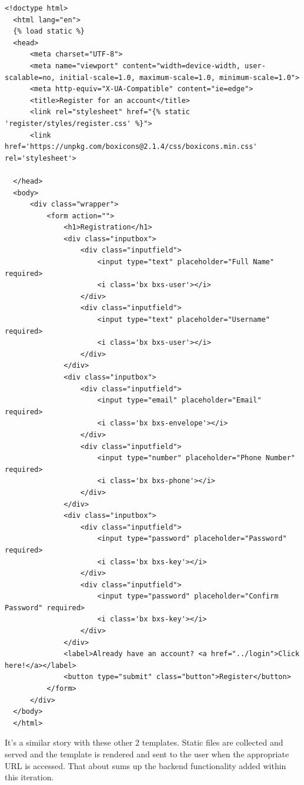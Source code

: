 \documentclass{article}
\begin{document}
\begin{lstlisting}[caption={templates/register.html}]
  <!doctype html>
  <html lang="en">
  {% load static %}
  <head>
      <meta charset="UTF-8">
      <meta name="viewport" content="width=device-width, user-scalable=no, initial-scale=1.0, maximum-scale=1.0, minimum-scale=1.0">
      <meta http-equiv="X-UA-Compatible" content="ie=edge">
      <title>Register for an account</title>
      <link rel="stylesheet" href="{% static 'register/styles/register.css' %}">
      <link href='https://unpkg.com/boxicons@2.1.4/css/boxicons.min.css' rel='stylesheet'>
  
  </head>
  <body>
      <div class="wrapper">
          <form action="">
              <h1>Registration</h1>
              <div class="inputbox">
                  <div class="inputfield">
                      <input type="text" placeholder="Full Name" required>
                      <i class='bx bxs-user'></i>
                  </div>
                  <div class="inputfield">
                      <input type="text" placeholder="Username" required>
                      <i class='bx bxs-user'></i>
                  </div>
              </div>
              <div class="inputbox">
                  <div class="inputfield">
                      <input type="email" placeholder="Email" required>
                      <i class='bx bxs-envelope'></i>
                  </div>
                  <div class="inputfield">
                      <input type="number" placeholder="Phone Number" required>
                      <i class='bx bxs-phone'></i>
                  </div>
              </div>
              <div class="inputbox">
                  <div class="inputfield">
                      <input type="password" placeholder="Password" required>
                      <i class='bx bxs-key'></i>
                  </div>
                  <div class="inputfield">
                      <input type="password" placeholder="Confirm Password" required>
                      <i class='bx bxs-key'></i>
                  </div>
              </div>
              <label>Already have an account? <a href="../login">Click here!</a></label>
              <button type="submit" class="button">Register</button>
          </form>
      </div>
  </body>
  </html>
\end{lstlisting}

It's a similar story with these other 2 templates. Static files are collected and served and the template is rendered and sent to the user when the appropriate URL is accessed. That about sums up the backend functionality added within this iteration. 
\end{document}
